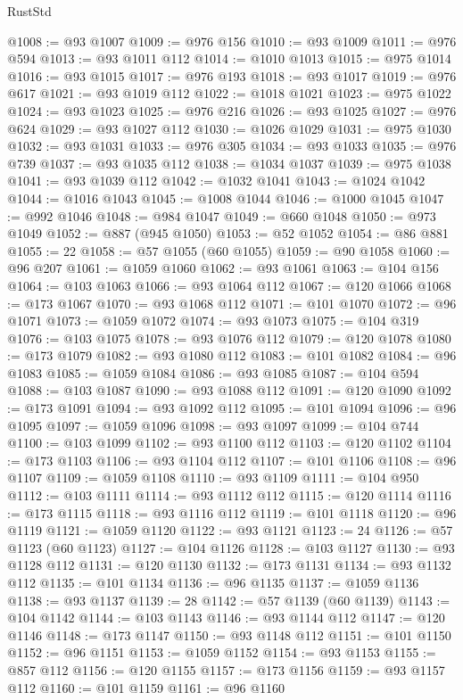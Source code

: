 \begin{lexlean}{RustStd}
\begin{coremodule}
@1008 := @93 @1007
@1009 := @976 @156
@1010 := @93 @1009
@1011 := @976 @594
@1013 := @93 @1011 @112
@1014 := @1010 @1013
@1015 := @975 @1014
@1016 := @93 @1015
@1017 := @976 @193
@1018 := @93 @1017
@1019 := @976 @617
@1021 := @93 @1019 @112
@1022 := @1018 @1021
@1023 := @975 @1022
@1024 := @93 @1023
@1025 := @976 @216
@1026 := @93 @1025
@1027 := @976 @624
@1029 := @93 @1027 @112
@1030 := @1026 @1029
@1031 := @975 @1030
@1032 := @93 @1031
@1033 := @976 @305
@1034 := @93 @1033
@1035 := @976 @739
@1037 := @93 @1035 @112
@1038 := @1034 @1037
@1039 := @975 @1038
@1041 := @93 @1039 @112
@1042 := @1032 @1041
@1043 := @1024 @1042
@1044 := @1016 @1043
@1045 := @1008 @1044
@1046 := @1000 @1045
@1047 := @992 @1046
@1048 := @984 @1047
@1049 := @660 @1048
@1050 := @973 @1049
@1052 := @887 (@945 @1050)
@1053 := @52 @1052
@1054 := @86 @881
@1055 := 22
@1058 := @57 @1055 (@60 @1055)
@1059 := @90 @1058
@1060 := @96 @207
@1061 := @1059 @1060
@1062 := @93 @1061
@1063 := @104 @156
@1064 := @103 @1063
@1066 := @93 @1064 @112
@1067 := @120 @1066
@1068 := @173 @1067
@1070 := @93 @1068 @112
@1071 := @101 @1070
@1072 := @96 @1071
@1073 := @1059 @1072
@1074 := @93 @1073
@1075 := @104 @319
@1076 := @103 @1075
@1078 := @93 @1076 @112
@1079 := @120 @1078
@1080 := @173 @1079
@1082 := @93 @1080 @112
@1083 := @101 @1082
@1084 := @96 @1083
@1085 := @1059 @1084
@1086 := @93 @1085
@1087 := @104 @594
@1088 := @103 @1087
@1090 := @93 @1088 @112
@1091 := @120 @1090
@1092 := @173 @1091
@1094 := @93 @1092 @112
@1095 := @101 @1094
@1096 := @96 @1095
@1097 := @1059 @1096
@1098 := @93 @1097
@1099 := @104 @744
@1100 := @103 @1099
@1102 := @93 @1100 @112
@1103 := @120 @1102
@1104 := @173 @1103
@1106 := @93 @1104 @112
@1107 := @101 @1106
@1108 := @96 @1107
@1109 := @1059 @1108
@1110 := @93 @1109
@1111 := @104 @950
@1112 := @103 @1111
@1114 := @93 @1112 @112
@1115 := @120 @1114
@1116 := @173 @1115
@1118 := @93 @1116 @112
@1119 := @101 @1118
@1120 := @96 @1119
@1121 := @1059 @1120
@1122 := @93 @1121
@1123 := 24
@1126 := @57 @1123 (@60 @1123)
@1127 := @104 @1126
@1128 := @103 @1127
@1130 := @93 @1128 @112
@1131 := @120 @1130
@1132 := @173 @1131
@1134 := @93 @1132 @112
@1135 := @101 @1134
@1136 := @96 @1135
@1137 := @1059 @1136
@1138 := @93 @1137
@1139 := 28
@1142 := @57 @1139 (@60 @1139)
@1143 := @104 @1142
@1144 := @103 @1143
@1146 := @93 @1144 @112
@1147 := @120 @1146
@1148 := @173 @1147
@1150 := @93 @1148 @112
@1151 := @101 @1150
@1152 := @96 @1151
@1153 := @1059 @1152
@1154 := @93 @1153
@1155 := @857 @112
@1156 := @120 @1155
@1157 := @173 @1156
@1159 := @93 @1157 @112
@1160 := @101 @1159
@1161 := @96 @1160

\end{coremodule}
\end{lexlean}
